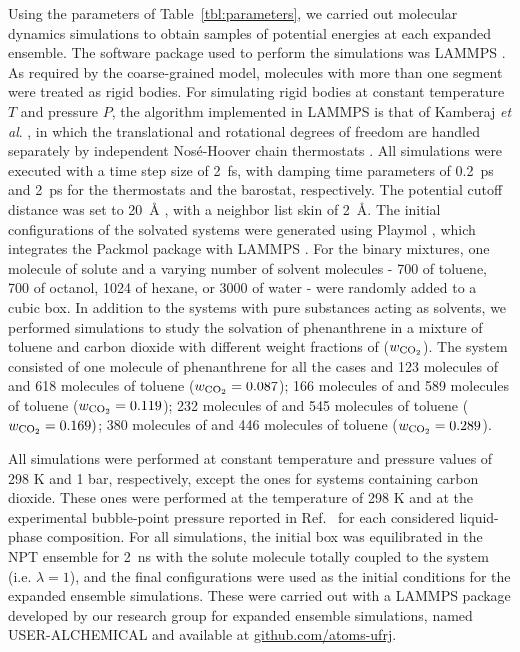 \documentclass[final,12p,times,twocolumn]{elsarticle}
\begin{document}
	Using the parameters of Table~\ref{tbl:parameters}, we carried out molecular dynamics simulations to obtain samples of potential energies at each expanded ensemble. The software package used to perform the simulations was LAMMPS \cite{lammps}. As required by the coarse-grained model, molecules with more than one segment were treated as rigid bodies. For simulating rigid bodies at constant temperature $T$ and pressure $P$, the algorithm implemented in LAMMPS is that of Kamberaj \textit{et al}. \cite{kamberaj}, in which the translational and rotational degrees of freedom are handled separately by independent Nos\'{e}-Hoover chain thermostats \cite{PhysRevA.31.1695}. All simulations were executed with a time step size of 2~fs, with damping time parameters of 0.2~ps and 2~ps for the thermostats and the barostat, respectively. The potential cutoff distance was set to 20~$\text{\AA}$ \cite{muller2017}, with a neighbor list skin of 2~$\text{\AA}$. The initial configurations of the solvated systems were generated using Playmol \cite{playmol}, which integrates the Packmol package \cite{packmol} with LAMMPS \cite{lammps}. For the binary mixtures, one molecule of solute and a varying number of solvent molecules - 700 of toluene, 700 of octanol, 1024 of hexane, or 3000 of water - were randomly added to a cubic box. In addition to the systems with pure substances acting as solvents, we performed simulations to study the solvation of phenanthrene in a mixture of toluene and carbon dioxide with different weight fractions of  ($w_\text{\ce{CO_2}}$). The system consisted of one molecule of phenanthrene for all the cases and 123 molecules of  and 618 molecules of toluene ($w_\text{\ce{CO_2}} = 0.087$); 166 molecules of  and 589 molecules of toluene ($w_\text{\ce{CO_2}} = 0.119$); 232 molecules of  and 545 molecules of toluene ($w_\text{\ce{CO_2}} = 0.169)$; 380 molecules of  and 446 molecules of toluene ($w_\text{\ce{CO_2}} = 0.289$).

	All simulations were performed at constant temperature and pressure values of 298 K and 1 bar, respectively, except the ones for systems containing carbon dioxide. These ones were performed at the temperature of 298 K and at the experimental bubble-point pressure reported in Ref.~\cite{co2toliq} for each considered liquid-phase composition. For all simulations, the initial box was equilibrated in the NPT ensemble for 2~ns with the solute molecule totally coupled to the system (i.e. $\lambda = 1$), and the final configurations were used as the initial conditions for the expanded ensemble simulations. These were carried out with a LAMMPS package developed by our research group for expanded ensemble simulations, named USER-ALCHEMICAL and available at \url{github.com/atoms-ufrj}.
\end{document}
